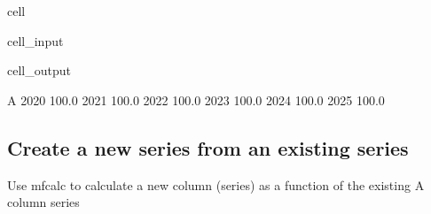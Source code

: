 \documentclass[letterpaper,10pt,english]{jupyterBook}
\begin{document}
\begin{sphinxuseclass}{cell}\begin{sphinxVerbatimInput}

\begin{sphinxuseclass}{cell_input}
\begin{sphinxVerbatim}[commandchars=\\\{\}]
                                   
                                               
    \PYG{p}{[}    \PYG{p}{]}           
    \PYG{p}{[}\PYG{p}{]}                                  
   
\end{sphinxVerbatim}

\end{sphinxuseclass}\end{sphinxVerbatimInput}
\begin{sphinxVerbatimOutput}

\begin{sphinxuseclass}{cell_output}
\begin{sphinxVerbatim}[commandchars=\\\{\}]
          A
2020  100.0
2021  100.0
2022  100.0
2023  100.0
2024  100.0
2025  100.0
\end{sphinxVerbatim}

\end{sphinxuseclass}\end{sphinxVerbatimOutput}

\end{sphinxuseclass}

\subsection{Create a new series from an existing series}
\label{\detokenize{content/04_PythonEssentials/mfcalc:create-a-new-series-from-an-existing-series}}
\sphinxAtStartPar
Use  mfcalc to calculate a new column (series) as a function of the existing A column series
\end{document}
